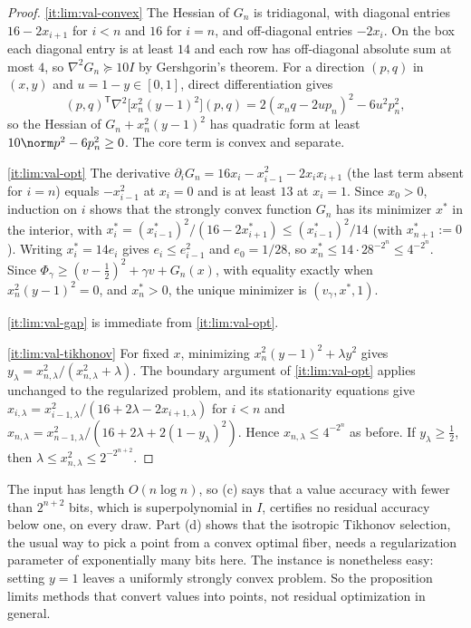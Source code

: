 \begin{proof}
\ref{it:lim:val-convex}
The Hessian of $G_n$ is tridiagonal, with diagonal entries $16-2x_{i+1}$
for $i<n$ and $16$ for $i=n$, and off-diagonal entries $-2x_i$. On the box
each diagonal entry is at least $14$ and each row has off-diagonal absolute
sum at most $4$, so $\nabla^2G_n\succeq10I$ by Gershgorin's theorem. For a
direction $(p,q)$ in $(x,y)$ and $u=1-y\in[0,1]$, direct differentiation
gives
\[
 (p,q)^{\mathsf T}\nabla^2\bigl[x_n^2(y-1)^2\bigr](p,q)
 =2(x_nq-2up_n)^2-6u^2p_n^2,
\]
so the Hessian of $G_n+x_n^2(y-1)^2$ has quadratic form at least
$10\norm p^2-6p_n^2\ge0$. The core term is convex and separate.

\ref{it:lim:val-opt}
The derivative $\partial_iG_n=16x_i-x_{i-1}^2-2x_ix_{i+1}$ (the last term
absent for $i=n$) equals $-x_{i-1}^2$ at $x_i=0$ and is at least $13$ at
$x_i=1$. Since $x_0>0$, induction on $i$ shows that the strongly convex
function $G_n$ has its minimizer $x^*$ in the interior, with
$x_i^*=(x_{i-1}^*)^2/(16-2x_{i+1}^*)\le(x_{i-1}^*)^2/14$ (with $x_{n+1}^*:=0$).
Writing $x_i^*=14e_i$ gives $e_i\le e_{i-1}^2$ and $e_0=1/28$, so
$x_n^*\le14\cdot28^{-2^n}\le4^{-2^n}$. Since
$\Phi_\gamma\ge(v-\frac12)^2+\gamma v+G_n(x)$, with equality exactly when
$x_n^2(y-1)^2=0$, and $x_n^*>0$, the unique minimizer is
$(v_\gamma,x^*,1)$.

\ref{it:lim:val-gap} is immediate from \ref{it:lim:val-opt}.

\ref{it:lim:val-tikhonov}
For fixed $x$, minimizing $x_n^2(y-1)^2+\lambda y^2$ gives
$y_\lambda=x_{n,\lambda}^2/(x_{n,\lambda}^2+\lambda)$. The boundary argument
of \ref{it:lim:val-opt} applies unchanged to the regularized problem, and
its stationarity equations give
$x_{i,\lambda}=x_{i-1,\lambda}^2/(16+2\lambda-2x_{i+1,\lambda})$ for $i<n$
and $x_{n,\lambda}=x_{n-1,\lambda}^2/(16+2\lambda+2(1-y_\lambda)^2)$. Hence
$x_{n,\lambda}\le4^{-2^n}$ as before. If $y_\lambda\ge\frac12$, then
$\lambda\le x_{n,\lambda}^2\le2^{-2^{n+2}}$.
\end{proof}

The input has length $O(n\log n)$, so (c) says that a value accuracy with
fewer than $2^{n+2}$ bits, which is superpolynomial in $I$, certifies no
residual accuracy below one, on every draw. Part (d) shows that the
isotropic Tikhonov selection, the usual way to pick a point from a convex
optimal fiber, needs a regularization parameter of exponentially many bits
here. The instance is nonetheless easy: setting $y=1$ leaves a uniformly
strongly convex problem. So the proposition limits methods that convert
values into points, not residual optimization in general.

